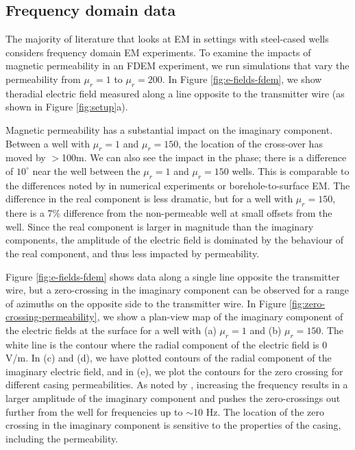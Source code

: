 \documentclass[onecolumn, extra, mreferee]{gji}
\begin{document}
\subsection{Frequency domain data}
The majority of literature that looks at EM in settings with steel-cased wells considers frequency domain EM experiments. To examine the impacts of magnetic permeability in an FDEM experiment, we run simulations that vary the permeability from $\mu_r=1$ to $\mu_r=200$. In Figure \ref{fig:e-fields-fdem}, we show theradial electric field measured along a line opposite to the transmitter wire (as shown in Figure \ref{fig:setup}a).

Magnetic permeability has a substantial impact on the imaginary component. Between a well with $\mu_r=1$ and $\mu_r=150$, the location of the cross-over has moved by $>$100m. We can also see the impact in the phase; there is a difference of $10^{\circ}$ near the well between the $\mu_r=1$  and $\mu_r=150$ wells. This is comparable to the differences noted by \cite{cuevas_effect_2018} in numerical experiments or borehole-to-surface EM. The difference in the real component is less dramatic, but for a well with $\mu_r=150$, there is a 7\% difference from the non-permeable well at small offsets from the well. Since the real component is larger in magnitude than the imaginary components, the amplitude of the electric field is dominated by the behaviour of the real component, and thus less impacted by permeability.



Figure \ref{fig:e-fields-fdem} shows data along a single line opposite the transmitter wire, but a zero-crossing in the imaginary component can be observed for a range of azimuths on the opposite side to the transmitter wire. In Figure \ref{fig:zero-crossing-permeability}, we show a plan-view map of the imaginary component of the electric fields at the surface for a well with (a) $\mu_r=1$ and (b) $\mu_r=150$. The white line is the contour where the radial component of the electric field is 0 V/m. In (c) and (d), we have plotted contours of the radial component of the imaginary electric field, and in (e), we plot the contours for the zero crossing for different casing permeabilities. As noted by \cite{wilt_casing_2020}, increasing the frequency results in a larger amplitude of the imaginary component and pushes the zero-crossings out further from the well for frequencies up to $\sim$10 Hz. The location of the zero crossing in the imaginary component is sensitive to the properties of the casing, including the permeability.
\end{document}
